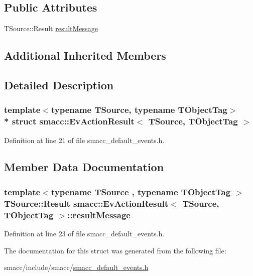 \subsection*{Public Attributes}
\begin{DoxyCompactItemize}
\item 
T\+Source\+::\+Result \hyperlink{structsmacc_1_1EvActionResult_a3ebe600713e0ddf9b76f34c725c2aeb2}{result\+Message}
\end{DoxyCompactItemize}
\subsection*{Additional Inherited Members}


\subsection{Detailed Description}
\subsubsection*{template$<$typename T\+Source, typename T\+Object\+Tag$>$\\*
struct smacc\+::\+Ev\+Action\+Result$<$ T\+Source, T\+Object\+Tag $>$}



Definition at line 21 of file smacc\+\_\+default\+\_\+events.\+h.



\subsection{Member Data Documentation}
\subsubsection[{\texorpdfstring{result\+Message}{resultMessage}}]{\setlength{\rightskip}{0pt plus 5cm}template$<$typename T\+Source , typename T\+Object\+Tag $>$ T\+Source\+::\+Result {\bf smacc\+::\+Ev\+Action\+Result}$<$ T\+Source, T\+Object\+Tag $>$\+::result\+Message}\hypertarget{structsmacc_1_1EvActionResult_a3ebe600713e0ddf9b76f34c725c2aeb2}{}\label{structsmacc_1_1EvActionResult_a3ebe600713e0ddf9b76f34c725c2aeb2}


Definition at line 23 of file smacc\+\_\+default\+\_\+events.\+h.



The documentation for this struct was generated from the following file\+:\begin{DoxyCompactItemize}
\item 
smacc/include/smacc/\hyperlink{smacc__default__events_8h}{smacc\+\_\+default\+\_\+events.\+h}\end{DoxyCompactItemize}
